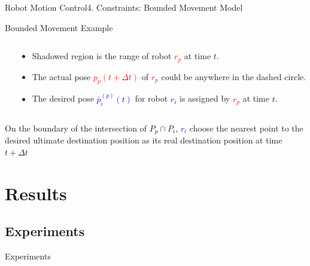 \documentclass[10pt]{beamer}
\begin{document}
\begin{frame}{Robot Motion Control}{4. Constraints: Bounded Movement Model}
\begin{block}{Bounded Movement Example}
\begin{columns}[T]
\begin{column}{.5\textwidth}
      \end{column}%
      \begin{column}{.45\textwidth}
        \begin{itemize}
        \item Shadowed region is the range of robot
          \textcolor{red}{$r_p$} at time $t$.
        \item The actual pose \textcolor{red}{$p_p(t+\Delta{t})$} of
          \textcolor{red}{$r_p$} could be anywhere in the dashed
          circle.
        \item The desired pose \textcolor{blue}{$\bar{p}_i^{(p)}(t)$}
          for robot \textcolor{blue}{$r_i$} is assigned by
          \textcolor{red}{$r_p$} at time $t$.
        \end{itemize}         
      \end{column}%
    \end{columns}
    On the boundary of the intersection of $P_p \cap P_i$,
    \textcolor{blue}{$r_i$} choose the nearest point to the desired
    ultimate destination position as its real destination position at
    time $t+\Delta{t}$
  \end{block}
\end{frame}


\section{Results}
\subsection{Experiments}
\begin{frame}{Experiments}{}
  \begin{block}{}
   
  \end{block}
\end{frame}
\end{document}
